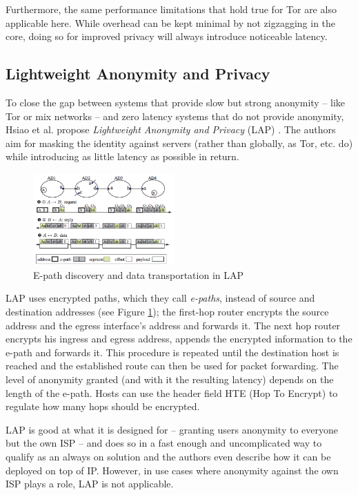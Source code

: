 \documentclass{acm_proc_article-sp}
\begin{document}
Furthermore, the same performance limitations that hold true for Tor are also applicable here. While overhead can be kept minimal by not zigzagging in the core, doing so for improved privacy will always introduce noticeable latency.
\subsection{Lightweight Anonymity and Privacy}
To close the gap between systems that provide slow but strong anonymity -- like Tor or mix networks -- and zero latency systems that do not provide anonymity, Hsiao et al. propose \emph{Lightweight Anonymity and Privacy} (LAP) \cite{lap}. The authors aim for masking the identity against servers (rather than globally, as Tor, etc. do) while introducing as little latency as possible in return. 

\begin{figure}[t]
  \includegraphics[width=0.48\textwidth]{images/epaths.PNG}
  \caption{E-path discovery and data transportation in LAP \cite{lap}}
  \label{fig:lap}
\end{figure}
LAP uses encrypted paths, which they call \emph{e-paths}, instead of source and destination addresses (see Figure \ref{fig:lap}); the first-hop router encrypts the source address and the egress interface's address and forwards it. The next hop router encrypts his ingress and egress address, appends the encrypted information to the e-path and forwards it. This procedure is repeated until the destination host is reached and the established route can then be used for packet forwarding. The level of anonymity granted (and with it the resulting latency) depends on the length of the e-path. Hosts can use the header field HTE (Hop To Encrypt) to regulate how many hops should be encrypted.

LAP is good at what it is designed for -- granting users anonymity to everyone but the own ISP -- and does so in a fast enough and uncomplicated way to qualify as an always on solution and the authors even describe how it can be deployed on top of IP. However, in use cases where anonymity against the own ISP plays a role, LAP is not applicable.
\end{document}
